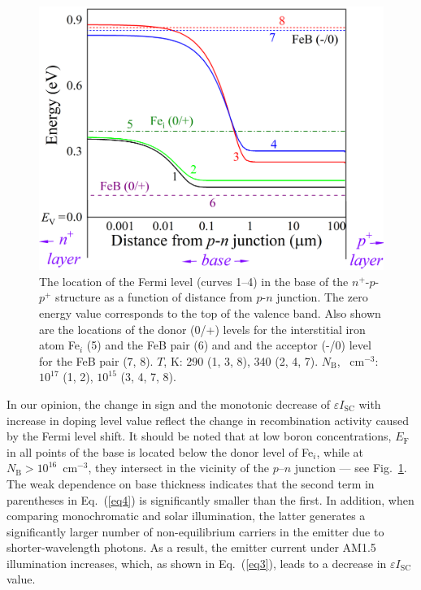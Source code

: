 \documentclass[a4paper,fleqn]{cas-sc}
\begin{document}
\begin{figure}
	\centering
     \includegraphics[width=0.49\linewidth]{Fig4.png}
	  \caption{The location of the Fermi level (curves 1--4) in the base of the $n^+$-$p$-$p^+$ structure
       as a function of distance from $p$-$n$ junction.
       The zero energy value corresponds to the top of the valence band.
       Also shown are the locations of
       the donor (0/+) levels for the interstitial iron atom Fe$_i$ (5)
       and the FeB pair (6) and
       and the acceptor (-/0) level for the FeB pair (7, 8).
       $T$, K: 290 (1, 3, 8), 340 (2, 4, 7).
       $N_\mathrm{B}$, ~cm$^{-3}$: $10^{17}$ (1, 2), $10^{15}$ (3, 4, 7, 8).
}\label{fig4}
\end{figure}

In our opinion, the change in sign and the monotonic decrease of $\varepsilon I_\mathrm{SC}$
with increase in doping level value
reflect the change in recombination activity caused by the Fermi level shift.
It should be noted that
at low boron concentrations, $E_\mathrm{F}$ in all points of the base is located below the donor level of Fe$_i$,
while at $N_\mathrm{B}>10^{16}$~cm$^{-3}$,
they intersect in the vicinity of the $p$–$n$ junction --- see Fig.~\ref{fig4}.
The weak dependence on base thickness indicates that the second term in parentheses in Eq.~(\ref{eq4}) is significantly smaller than the first.
In addition, when comparing monochromatic and solar illumination,
the latter generates a significantly larger number of non-equilibrium carriers in the emitter
due to shorter-wavelength photons.
As a result, the emitter current under AM1.5 illumination increases,
which, as shown in Eq.~(\ref{eq3}), leads to a decrease in $\varepsilon I_\mathrm{SC}$ value.
\end{document}
